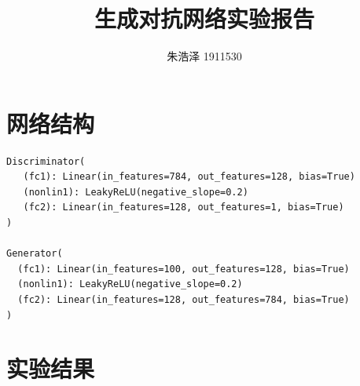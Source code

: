 \documentclass{article}
\begin{document}
\title{生成对抗网络实验报告}
\author{朱浩泽 1911530}
\maketitle
\section{网络结构}
\large
\begin{lstlisting}
Discriminator(
   (fc1): Linear(in_features=784, out_features=128, bias=True)
   (nonlin1): LeakyReLU(negative_slope=0.2)
   (fc2): Linear(in_features=128, out_features=1, bias=True)
)   

Generator(
  (fc1): Linear(in_features=100, out_features=128, bias=True)
  (nonlin1): LeakyReLU(negative_slope=0.2)
  (fc2): Linear(in_features=128, out_features=784, bias=True)
)
\end{lstlisting}
\section{实验结果}
\end{document}
